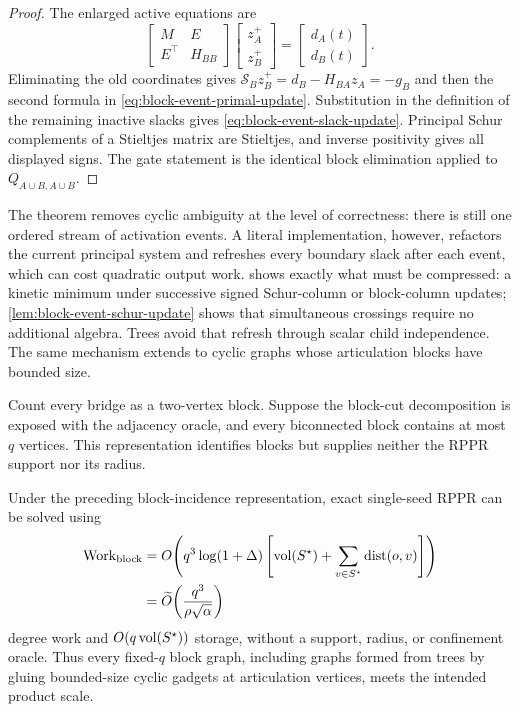 \begin{proof}
The enlarged active equations are
\begin{equation*}
 \begin{bmatrix}M&E\\E^\top&H_{BB}\end{bmatrix}
 \begin{bmatrix}z_A^+\\z_B^+\end{bmatrix}
 =\begin{bmatrix}d_A(t)\\d_B(t)\end{bmatrix}.
\end{equation*}
Eliminating the old coordinates gives
$\mathcal S_Bz_B^+=d_B-H_{BA}z_A=-g_B$ and then the second formula in
\cref{eq:block-event-primal-update}.  Substitution in the definition of the
remaining inactive slacks gives
\cref{eq:block-event-slack-update}.  Principal Schur complements of a
Stieltjes matrix are Stieltjes, and inverse positivity gives all displayed
signs.  The gate statement is the identical block elimination applied to
$Q_{A\cup B,A\cup B}$.
\end{proof}

The theorem removes cyclic ambiguity at the level of correctness: there is
still one ordered stream of activation events.  A literal implementation,
however, refactors the current principal system and refreshes every boundary
slack after each event, which can cost quadratic output work.
 shows exactly what must be compressed: a
kinetic minimum under successive signed Schur-column or block-column updates;
\cref{lem:block-event-schur-update} shows that simultaneous crossings require
no additional algebra.  Trees avoid
that refresh through scalar child independence.  The same mechanism extends
to cyclic graphs whose articulation blocks have bounded size.

Count every bridge as a two-vertex block.  Suppose the block-cut
decomposition is exposed with the adjacency oracle, and every biconnected
block contains at most $q$ vertices.  This representation identifies blocks
but supplies neither the RPPR support nor its radius.

\begin{theorem}
\label{thm:bounded-block-response}
Under the preceding block-incidence representation, exact single-seed RPPR
can be solved using
\begin{align}
 \operatorname{Work}_{\rm block}
 &=O\!\left(
  q^3\log(1+\Delta)
  \left[
   \operatorname{vol}(S^\star)
   +\sum_{v\in S^\star}\operatorname{dist}(o,v)
  \right]
 \right)\notag\\
 &=\widetilde O\!\left(
  \frac{q^3}{\rho\sqrt\alpha}
 \right)
 \label{eq:bounded-block-work}
\end{align}
degree work and $O(q\operatorname{vol}(S^\star))$ storage, without a support, radius, or
confinement oracle.  Thus every fixed-$q$ block graph, including graphs formed
from trees by gluing bounded-size cyclic gadgets at articulation vertices,
meets the intended product scale.
\end{theorem}

